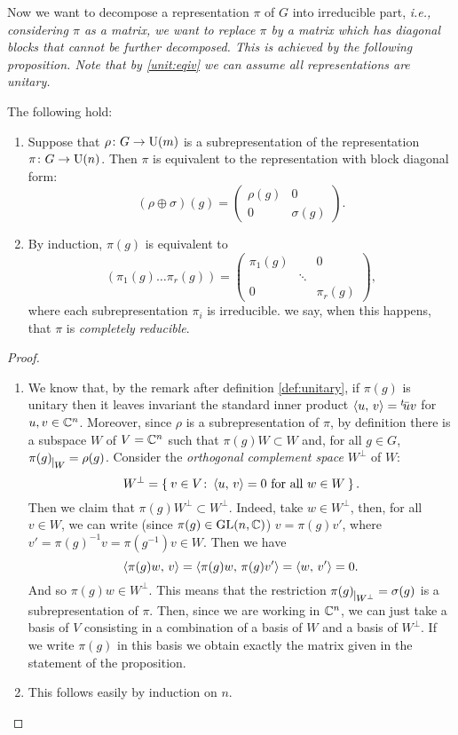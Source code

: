Now we want to decompose a representation $\pi$ of $G$ into irreducible part, \it{i.e.}, considering $\pi$ as a matrix, we want to replace $\pi$ by a matrix which has diagonal blocks that cannot be further decomposed. This is achieved by the following proposition.
Note that by \ref{unit:eqiv} we can assume all representations are unitary.
\begin{prop} The following hold:
\begin{enumerate}
\item Suppose that $\rho\colon G\rightarrow \operatorname{U}(m)$ is a subrepresentation of the representation $\pi\colon G\rightarrow \operatorname{U}(n)$. Then $\pi$ is equivalent to the representation with block diagonal form:
\[(\rho \oplus \sigma)(g)=
\begin{pmatrix}
\rho(g) & 0 \\
0 		& \sigma(g)
\end{pmatrix}.
\]
\item By induction, $\pi(g)$ is equivalent to
\[
(\pi_1(g)\dots \pi_r(g))= 
\begin{pmatrix}
\pi_1(g)  &{} &0\\
{} &\ddots &{} \\
0 &{}  &\pi_r(g)
\end{pmatrix},
\]
where each subrepresentation $\pi_i$  is irreducible. we say, when this happens, that $\pi$ is \emph{completely reducible}. 
\end{enumerate}
\end{prop}
\begin{proof}
\begin{enumerate}
\item We know that, by the remark after definition \ref{def:unitary}, if $\pi(g)$ is unitary then it leaves invariant the standard inner product $\braket{u,\, v}={}^t\!\bar{u}v$ for $u,v \in {\mathbb C}^n$. Moreover, since $\rho$ is a subrepresentation of $\pi$, by definition there is a subspace $W$ of $V={\mathbb C}^n$ such that $\pi(g)W\subset W$ and, for all $g\in G$, $\pi(g)_{\mkern 1mu \vrule height 2ex\mkern2mu W}= \rho(g)$.  Consider the \emph{orthogonal complement space} $W^\perp$ of $W$:
\[
W^{\perp}= \Set{v \in V \colon \braket{u, \, v}=0 \text{ for all } w \in W}.
\]
Then we claim that $\pi(g)W^{\perp}\subset W^{\perp}$. Indeed, take $w\in W^{\perp}$, then, for all $v\in W$, we can write (since $\pi(g) \in \operatorname{GL}(n,{\mathbb C})$) $v=\pi(g)v'$, where $v'=\pi(g)^{-1}v=\pi(g^{-1})v \in W$. Then we have 
\[
\braket{\pi(g)w,\, v}=\braket{\pi(g)w,\, \pi(g)v'}=\braket{w,\, v'}=0.
\]
And so $\pi(g)w\in W^{\perp}$. This means that the restriction $\pi(g)_{\mkern 1mu \vrule height 2ex\mkern2mu W^{\perp}}= \sigma(g)$ is a subrepresentation of $\pi$.  Then, since we are working in ${\mathbb C}^n$, we can just take a basis of $V$ consisting in a combination of a basis of $W$ and a basis of $W^{\perp}$. If we write $\pi(g)$ in this basis we obtain exactly the matrix given in the statement of the proposition.
\item This follows easily by induction on $n$.
\end{enumerate}
\end{proof}
